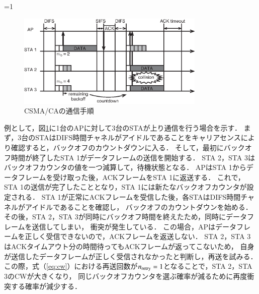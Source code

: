 \documentclass[master]{kuisthesis}		%
\newcounter{flagFig}
\begin{document}
			\par
			\ifnum\value{flagFig}=1{
			\begin{figure}[htbp]
				\begin{center}
					\includegraphics[width=0.8\textwidth]{fig/csmaca.eps}
					\caption{CSMA/CAの通信手順}
					\label{fig:csmaca}
				\end{center}
			\end{figure}}\fi
			例として，図\ref{fig:csmaca}に1台のAPに対して3台のSTAが上り通信を行う場合を示す．
			まず，3台のSTAはDIFS時間チャネルがアイドルであることをキャリアセンスにより確認すると，バックオフのカウントダウンに入る．
			そして，最初にバックオフ時間が終了したSTA 1がデータフレームの送信を開始する．
			STA 2，STA 3はバックオフカウンタの値を一つ減算して，待機状態となる．
			APはSTA 1からデータフレームを受け取った後，ACKフレームをSTA 1に返送する．
			これで，STA 1の送信が完了したこととなり，STA 1には新たなバックオフカウンタが設定される．
			STA 1が正常にACKフレームを受信した後，各STAはDIFS時間チャネルがアイドルであることを確認し，
			バックオフのカウントダウンを始める．
			その後，STA 2，STA 3が同時にバックオフ時間を終えたため，同時にデータフレームを送信してしまい，
			衝突が発生している．
			この場合，APはデータフレームを正しく受信できないので，ACKフレームを返送しない．
			STA 2，STA 3はACKタイムアウト分の時間待ってもACKフレームが返ってこないため，
			自身が送信したデータフレームが正しく受信されなかったと判断し，再送を試みる．
			この際，式（\ref{eq:cw}）における再送回数が$n_{\rm retry}=1$となることで，STA 2，STA 3のCWが大きくなり，
			同じバックオフカウンタを選ぶ確率が減るために再度衝突する確率が減少する．
\end{document}
